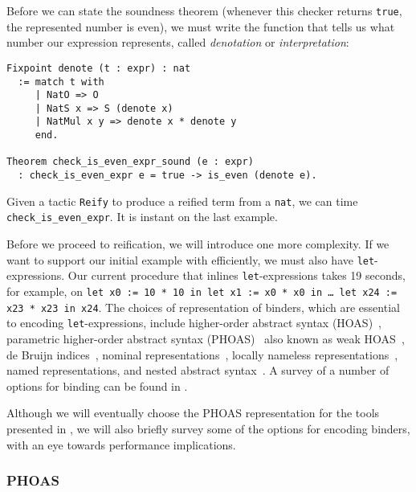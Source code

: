 Before we can state the soundness theorem (whenever this checker returns \texttt{true}, the represented number is even), we must write the function that tells us what number our expression represents, called \emph{denotation} or \emph{interpretation}:
\begin{verbatim}
Fixpoint denote (t : expr) : nat
  := match t with
     | NatO => O
     | NatS x => S (denote x)
     | NatMul x y => denote x * denote y
     end.

Theorem check_is_even_expr_sound (e : expr)
  : check_is_even_expr e = true -> is_even (denote e).
\end{verbatim}

Given a tactic \texttt{Reify} to produce a reified term from a \texttt{nat}, we can time \texttt{check_is_even_expr}.
It is instant on the last example.%

Before we proceed to reification, we will introduce one more complexity.
If we want to support our initial example with \space efficiently, we must also have \texttt{let}-expressions.
Our current procedure that inlines \texttt{let}-expressions takes 19 seconds, for example, on \texttt{let x0 := 10 * 10 in let x1 := x0 * x0 in … let x24 := x23 * x23 in x24}.
The choices of representation of binders, which are essential to encoding \texttt{let}-expressions, include higher-order abstract syntax (HOAS)~\cite{HOAS}, parametric higher-order abstract syntax (PHOAS)~\cite{PhoasICFP08} also known as weak HOAS~\cite{weak2013Ciaffaglione}, de Bruijn indices~\cite{debruijn1972}, nominal representations~\cite{Nominal2003Pitts}, locally nameless representations~\cite{Locally2012Chargueraud,locally2007Leroy}, named representations, and nested abstract syntax~\cite{Nested2012Hirschowitz,deBruijn1999Bird}.
A survey of a number of options for binding can be found in \autocite{Engineering2008Aydemir}.

Although we will eventually choose the PHOAS representation for the tools presented in , we will also briefly survey some of the options for encoding binders, with an eye towards performance implications.

\subsubsection{PHOAS} \label{sec:binders:PHOAS}

